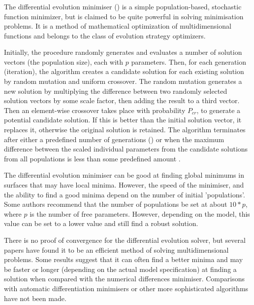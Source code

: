 \subsubsection{}\label{sec:Minimiser-DESolver}

The differential evolution minimiser () is a simple population-based, stochastic function minimizer, but is claimed to be quite powerful in solving minimisation problems. It is a method of mathematical optimization of multidimensional functions and belongs to the class of evolution strategy optimizers.

Initially, the procedure randomly generates and evaluates a number of solution vectors (the population size), each with $p$ parameters. Then, for each generation (iteration), the algorithm creates a candidate solution for each existing solution by random mutation and uniform crossover. The random mutation generates a new solution by multiplying the difference between two randomly selected solution vectors by some scale factor, then adding the result to a third vector. Then an element-wise crossover takes place with probability $P_{cr}$, to generate a potential candidate solution. If this is better than the initial solution vector, it replaces it, otherwise the original solution is retained. The algorithm terminates after either a predefined number of generations () or when the maximum difference between the scaled individual parameters from the candidate solutions from all populations is less than some predefined amount .

The differential evolution minimiser can be good at finding global minimums in surfaces that may have local minima. However, the speed of the minimiser, and the ability to find a good minima depend on the number of initial 'populations'. Some authors recommend that the number of populations be set at about $10*p$, where $p$ is the number of free parameters. However, depending on the model, this value can be set to a lower value and still find a robust solution.

There is no proof of convergence for the differential evolution solver, but several papers have found it to be an efficient method of solving multidimensional problems. Some results suggest that it can often find a better minima and may be faster or longer (depending on the actual model specification) at finding a solution when compared with the numerical differences minimiser. Comparisons with automatic differentiation minimisers or other more sophisticated algorithms have not been made.

